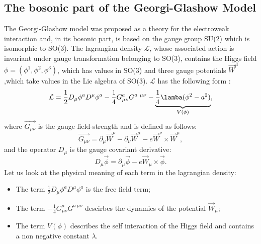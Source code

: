 \subsection{The bosonic part of the Georgi-Glashow Model}
The Georgi-Glashow model was proposed as a theory for the electroweak interaction and, in its bosonic part, is based on the gauge group SU(2) which is isomorphic to SO(3).
The lagrangian density $\mathcal{L}$, whose associated action is invariant under gauge transformation belonging to SO(3), contains the Higgs field $\phi = ( \phi^1, \phi^2 , \phi^3)$, which has values in SO(3) and three gauge potentials $\Vec{W}^\mu$,which take values in the Lie algebra of SO(3). 
$\mathcal{L}$ has the following form : 
\begin{equation}
\mathcal{L}= \frac{1}{2}D_{\mu}\phi^a D^\mu \phi^a  -\frac{1}{4} G_{\mu \nu}^a G^{a \ \mu \nu} - \underbrace{\frac{1}{4}\lamba (\phi^2 -a^2)}_{V(\phi)},
\end{equation}
where $\Vec{G_{\mu \nu}}$ is the gauge field-strength and is defined as follows:
\begin{equation}
\Vec{G_{\mu \nu}} = \partial_{\mu}  \Vec{W}^\nu -\partial_{\nu}  \Vec{W}^\mu - e \Vec{W}^\nu \times \Vec{W}^\mu,
\end{equation}
and the operator $D_{\mu}$ is the gauge covariant derivative: 
\begin{equation}
D_\mu \Vec{\phi} = \partial_\mu \Vec{\phi} - e \Vec{W}_\mu \times \Vec{\phi}.
\end{equation}
Let us look at the physical meaning of each term in the lagrangian density:
\begin{itemize}
    \item The term $\frac{1}{2}D_{\mu}\phi^a D^\mu \phi^a $ is the free field term;
    \item The term  $-\frac{1}{4} G_{\mu \nu}^a G^{a \ \mu \nu}$ descirbes the dynamics of the potential $\Vec{W}_{\mu}$;
    \item The term  $V(\phi) $ describes the self interaction of the Higgs field and contains a non negative constant $\lambda$.
\end{itemize}
\\
